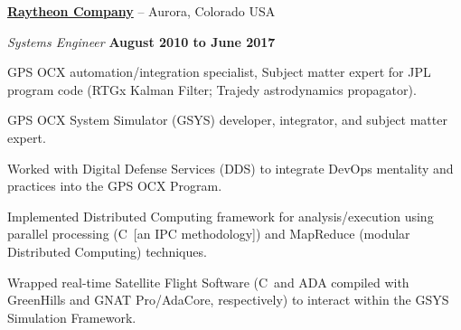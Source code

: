 \documentclass[8pt]{article}
\newenvironment{outerlist}[1][\enskip\textbullet]%
       {\begin{compactenum}[#1]}{\end{compactenum}%
        \vspace{-.3\baselineskip}}
\newenvironment{innerlist}[1][\enskip\textbullet]%
        {\begin{compactenum}[#1]}{\end{compactenum}}
\def\CC{{C\nolinebreak[4]\hspace{-.05em}\raisebox{.4ex}{\tiny\bf ++}}}
\begin{document}
                \href{http://www.raytheon.com/}{\textbf{Raytheon Company}} -- Aurora, Colorado USA
                \begin{outerlist}
                        \item[] \textit{Systems Engineer}%
                                \hfill \textbf{August 2010 to June 2017}
                        \begin{innerlist}
                                \item GPS OCX automation/integration specialist, Subject matter expert for JPL program code (RTGx Kalman Filter; Trajedy astrodynamics propagator).
                                \item GPS OCX System Simulator (GSYS) developer, integrator, and subject matter expert.
                                \item Worked with Digital Defense Services (DDS) to integrate DevOps mentality and practices into the GPS OCX Program.
                                \item Implemented Distributed Computing framework for analysis/execution using parallel processing (\CC\ [an IPC methodology]) and MapReduce (modular Distributed Computing) techniques. 
                                \item Wrapped real-time Satellite Flight Software (\CC\ and ADA compiled with GreenHills and GNAT Pro/AdaCore, respectively) to interact within the GSYS Simulation Framework.
                        \end{innerlist}
                \end{outerlist}
\end{document}
